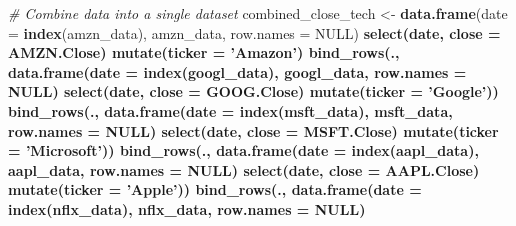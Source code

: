 \documentclass[]{article}
\newenvironment{Shaded}{\begin{snugshade}}{\end{snugshade}}
\newcommand{\CommentTok}[1]{\textcolor[rgb]{0.56,0.35,0.01}{\textit{#1}}}
\newcommand{\DataTypeTok}[1]{\textcolor[rgb]{0.13,0.29,0.53}{#1}}
\newcommand{\KeywordTok}[1]{\textcolor[rgb]{0.13,0.29,0.53}{\textbf{#1}}}
\newcommand{\NormalTok}[1]{#1}
\newcommand{\OperatorTok}[1]{\textcolor[rgb]{0.81,0.36,0.00}{\textbf{#1}}}
\newcommand{\OtherTok}[1]{\textcolor[rgb]{0.56,0.35,0.01}{#1}}
\newcommand{\StringTok}[1]{\textcolor[rgb]{0.31,0.60,0.02}{#1}}
\begin{document}
\begin{Shaded}
\begin{Highlighting}[]
\CommentTok{# Combine data into a single dataset}
\NormalTok{combined_close_tech <-}\StringTok{ }\KeywordTok{data.frame}\NormalTok{(}\DataTypeTok{date =} \KeywordTok{index}\NormalTok{(amzn_data),}
\NormalTok{                                  amzn_data,}
                                  \DataTypeTok{row.names =} \OtherTok{NULL}\NormalTok{) }\OperatorTok{%>%}
\StringTok{  }\KeywordTok{select}\NormalTok{(date, }\DataTypeTok{close =}\NormalTok{ AMZN.Close) }\OperatorTok{%>%}
\StringTok{  }\KeywordTok{mutate}\NormalTok{(}\DataTypeTok{ticker =} \StringTok{'Amazon'}\NormalTok{) }\OperatorTok{%>%}
\StringTok{  }\KeywordTok{bind_rows}\NormalTok{(.,}
            \KeywordTok{data.frame}\NormalTok{(}\DataTypeTok{date =} \KeywordTok{index}\NormalTok{(googl_data),}
\NormalTok{                       googl_data,}
                       \DataTypeTok{row.names =} \OtherTok{NULL}\NormalTok{) }\OperatorTok{%>%}
\StringTok{              }\KeywordTok{select}\NormalTok{(date, }\DataTypeTok{close =}\NormalTok{ GOOG.Close) }\OperatorTok{%>%}
\StringTok{              }\KeywordTok{mutate}\NormalTok{(}\DataTypeTok{ticker =} \StringTok{'Google'}\NormalTok{)) }\OperatorTok{%>%}
\StringTok{  }\KeywordTok{bind_rows}\NormalTok{(.,}
            \KeywordTok{data.frame}\NormalTok{(}\DataTypeTok{date =} \KeywordTok{index}\NormalTok{(msft_data),}
\NormalTok{                       msft_data,}
                       \DataTypeTok{row.names =} \OtherTok{NULL}\NormalTok{) }\OperatorTok{%>%}
\StringTok{              }\KeywordTok{select}\NormalTok{(date, }\DataTypeTok{close =}\NormalTok{ MSFT.Close) }\OperatorTok{%>%}
\StringTok{              }\KeywordTok{mutate}\NormalTok{(}\DataTypeTok{ticker =} \StringTok{'Microsoft'}\NormalTok{)) }\OperatorTok{%>%}
\StringTok{  }\KeywordTok{bind_rows}\NormalTok{(.,}
            \KeywordTok{data.frame}\NormalTok{(}\DataTypeTok{date =} \KeywordTok{index}\NormalTok{(aapl_data),}
\NormalTok{                       aapl_data,}
                       \DataTypeTok{row.names =} \OtherTok{NULL}\NormalTok{) }\OperatorTok{%>%}
\StringTok{              }\KeywordTok{select}\NormalTok{(date, }\DataTypeTok{close =}\NormalTok{ AAPL.Close) }\OperatorTok{%>%}
\StringTok{              }\KeywordTok{mutate}\NormalTok{(}\DataTypeTok{ticker =} \StringTok{'Apple'}\NormalTok{)) }\OperatorTok{%>%}
\StringTok{  }\KeywordTok{bind_rows}\NormalTok{(.,}
            \KeywordTok{data.frame}\NormalTok{(}\DataTypeTok{date =} \KeywordTok{index}\NormalTok{(nflx_data),}
\NormalTok{                       nflx_data,}
                       \DataTypeTok{row.names =} \OtherTok{NULL}\NormalTok{) }\OperatorTok{%>%}
}}}}}}}}}}}}}
\end{Highlighting}
\end{Shaded}
\end{document}
